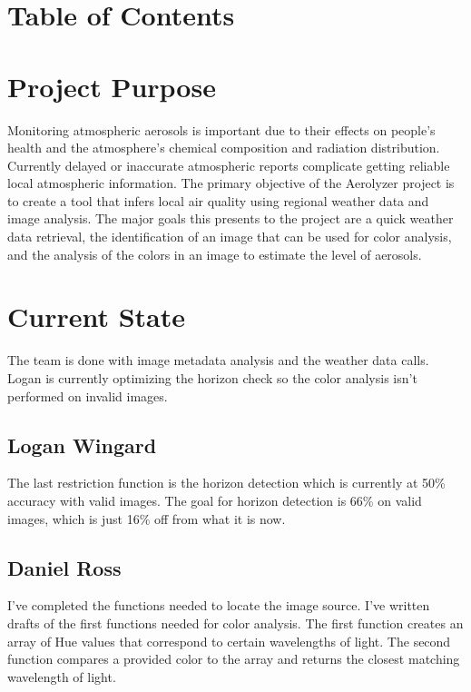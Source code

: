 \documentclass[onecolumn, draftclsnofoot,10pt, compsoc]{IEEEtran}
\begin{document}
\section{Table of Contents}
\tableofcontents


\clearpage

\begin{singlespace}

	\section{Project Purpose}
		Monitoring atmospheric aerosols is important due to their effects on people’s health and the atmosphere's chemical composition and radiation distribution.
		Currently delayed or inaccurate atmospheric reports complicate getting reliable local atmospheric information.
		The primary objective of the Aerolyzer project is to create a tool that infers local air quality using regional weather data and image analysis.
		The major goals this presents to the project are a quick weather data retrieval, the identification of an image that can be used for color analysis, and the analysis of the colors in an image to estimate the level of aerosols.
	
	\section{Current State}
		The team is done with image metadata analysis and the weather data calls.
		Logan is currently optimizing the horizon check so the color analysis isn't performed on invalid images.
		\subsection{Logan Wingard}
		The last restriction function is the horizon detection which is currently at 50\% accuracy with valid images.
		The goal for horizon detection is 66\% on valid images, which is just 16\% off from what it is now.
		\subsection{Daniel Ross}
		I've completed the functions needed to locate the image source.
		I've written drafts of the first functions needed for color analysis.
		The first function creates an array of Hue values that correspond to certain wavelengths of light.
		The second function compares a provided color to the array and returns the closest matching wavelength of light.


\end{singlespace}
\end{document}
